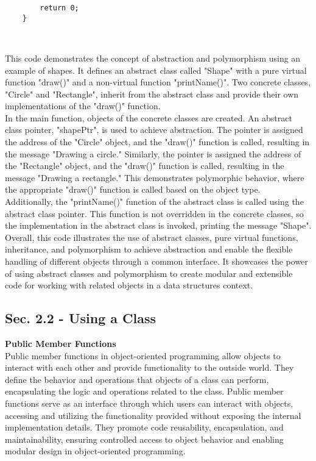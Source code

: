 \begin{solution}
\begin{verbatim}
        return 0;
    }
    \end{verbatim} \\
    \horizontalline

    This code demonstrates the concept of abstraction and polymorphism using an example of shapes. It defines an abstract class called "Shape" with a pure virtual function "draw()" and a non-virtual function "printName()". Two concrete classes, 
    "Circle" and "Rectangle", inherit from the abstract class and provide their own implementations of the "draw()" function. \\

    \noindent In the main function, objects of the concrete classes are created. An abstract class pointer, "shapePtr", is used to achieve abstraction. The pointer is assigned the address of the "Circle" object, and the "draw()" function is called, resulting
    in the message "Drawing a circle." Similarly, the pointer is assigned the address of the "Rectangle" object, and the "draw()" function is called, resulting in the message "Drawing a rectangle." This demonstrates polymorphic behavior, where the
    appropriate "draw()" function is called based on the object type. \\

    \noindent Additionally, the "printName()" function of the abstract class is called using the abstract class pointer. This function is not overridden in the concrete classes, so the implementation in the abstract class is invoked, printing the message 
    "Shape". \\

    \noindent Overall, this code illustrates the use of abstract classes, pure virtual functions, inheritance, and polymorphism to achieve abstraction and enable the flexible handling of different objects through a common interface. It showcases the power 
    of using abstract classes and polymorphism to create modular and extensible code for working with related objects in a data structures context. \\
\end{solution}

\subsection{Sec. 2.2 - Using a Class}
\noindent \textbf{Public Member Functions} \\

Public member functions in object-oriented programming allow objects to interact with each other and provide functionality to the outside world. They define the behavior and operations that objects of a class can perform, encapsulating the logic and operations
related to the class. Public member functions serve as an interface through which users can interact with objects, accessing and utilizing the functionality provided without exposing the internal implementation details. They promote code reusability, encapsulation, 
and maintainability, ensuring controlled access to object behavior and enabling modular design in object-oriented programming. \\

